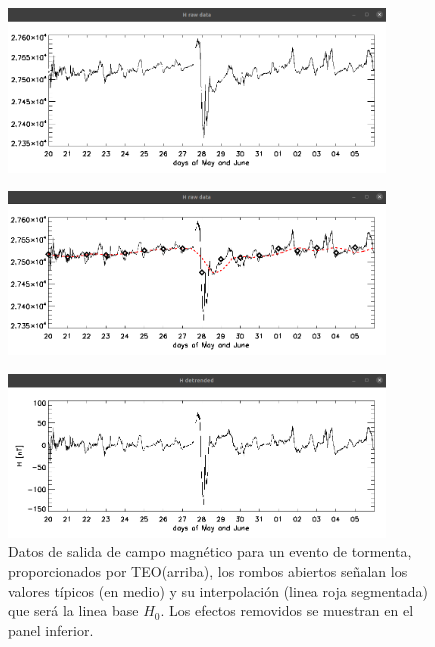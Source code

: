 \begin{figure}[h!]
    \centering
    \centerline{\Large \bf   
         \hfill}
          \centerline{\Large \bf   
         \hfill}
     \includegraphics[width=10.0cm]{Images/cap2/lineabase/diadia/paso2.1.png}
     \centerline{\Large \bf   
         \hfill}
     \includegraphics[width=10.0cm]{Images/cap2/lineabase/diadia/paso2.2.png}     
     \centerline{\Large \bf   
         \hfill}
      \includegraphics[width=10.0cm]{Images/cap2/lineabase/diadia/paso2.3.png}         
       \caption{Datos de salida de campo magnético para un evento de tormenta, proporcionados por TEO(arriba), los rombos abiertos señalan los valores típicos (en medio) y su interpolación (linea roja segmentada) que será la linea base $H_0$. Los efectos removidos se muestran en el panel inferior.}
    \label{fig:diadia2}
\end{figure}

